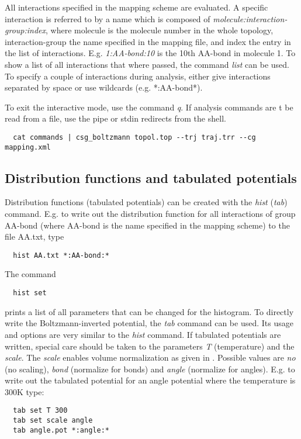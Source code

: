 All interactions specified in the mapping scheme are evaluated. A specific interaction is referred to by a name which is composed of \textit{molecule:interaction-group:index}, where molecule is the molecule number in the whole topology, interaction-group the name specified in the mapping file, and index the entry in the list of interactions. E.g. \textit{1:AA-bond:10} is the 10th AA-bond in molecule 1. To show a list of all interactions that where passed, the command \textit{list} can be used. To specify a couple of interactions during analysis, either give interactions separated by space or use wildcards (e.g. *:AA-bond*).

To exit the interactive mode, use the command \textit{q}. If analysis commands are t be read from a file, use the pipe or stdin redirects from the shell.
\begin{verbatim}
  cat commands | csg_boltzmann topol.top --trj traj.trr --cg mapping.xml
\end{verbatim}

\subsection{Distribution functions and tabulated potentials}
Distribution functions (tabulated potentials) can be created with the \textit{hist} (\textit{tab}) command.
E.g. to write out the distribution function for all interactions of group AA-bond (where AA-bond is the name specified in the mapping scheme) to the file AA.txt, type
\begin{verbatim}
  hist AA.txt *:AA-bond:*
\end{verbatim}
The command
\begin{verbatim}
  hist set
\end{verbatim}
prints a list of all parameters that can be changed for the histogram. To directly write the Boltzmann-inverted potential, the \textit{tab} command can be used. Its usage and options are very similar to the \textit{hist} command. If tabulated potentials are written, special care should be taken to the parameters \textit{T} (temperature) and the \textit{scale}. The \textit{scale} enables volume normalization as given in . Possible values are \textit{no} (no scaling), \textit{bond} (normalize for bonds) and \textit{angle} (normalize for angles). E.g. to write out the tabulated potential for an angle potential where the temperature is 300K type:
\begin{verbatim}
  tab set T 300
  tab set scale angle
  tab angle.pot *:angle:*
\end{verbatim}

